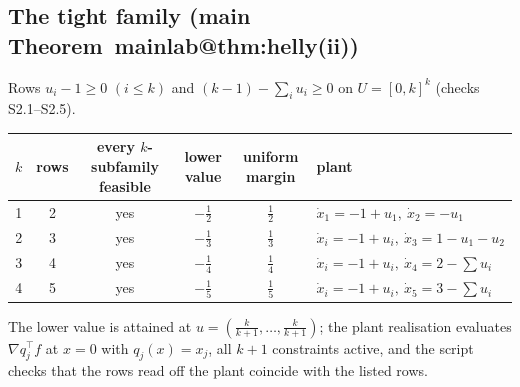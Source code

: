 \documentclass[11pt,a4paper]{article}
\makeatletter
\theoremstyle{plain}
\theoremstyle{definition}
\theoremstyle{remark}
\newcommand{\tfr}[2]{\tfrac{#1}{#2}}
\newcommand{\mref}[1]{\csname mainlab@#1\endcsname}
\makeatother
\begin{document}
\subsection{The tight family (main Theorem~\mref{thm:helly}(ii))}
Rows $u_i-1\ge0$ $(i\le k)$ and $(k-1)-\sum_iu_i\ge0$ on $U=[0,k]^k$ (checks S2.1--S2.5).
\begin{center}\footnotesize
\begin{tabular}{cccccl}
\toprule
$k$ & rows & every $k$-subfamily feasible & lower value & uniform margin & plant\\
\midrule
1 & 2 & yes & $-\tfr12$ & $\tfr12$ & $\dot x_1=-1+u_1,\ \dot x_2=-u_1$\\
2 & 3 & yes & $-\tfr13$ & $\tfr13$ & $\dot x_i=-1+u_i,\ \dot x_3=1-u_1-u_2$\\
3 & 4 & yes & $-\tfr14$ & $\tfr14$ & $\dot x_i=-1+u_i,\ \dot x_4=2-\sum u_i$\\
4 & 5 & yes & $-\tfr15$ & $\tfr15$ & $\dot x_i=-1+u_i,\ \dot x_5=3-\sum u_i$\\
\bottomrule
\end{tabular}
\end{center}
The lower value is attained at $u=(\tfr{k}{k+1},\dots,\tfr{k}{k+1})$; the plant realisation evaluates $\nabla q_j^\top f$ at $x=0$ with $q_j(x)=x_j$, all $k+1$ constraints active, and the script checks that the rows read off the plant coincide with the listed rows.
\end{document}
